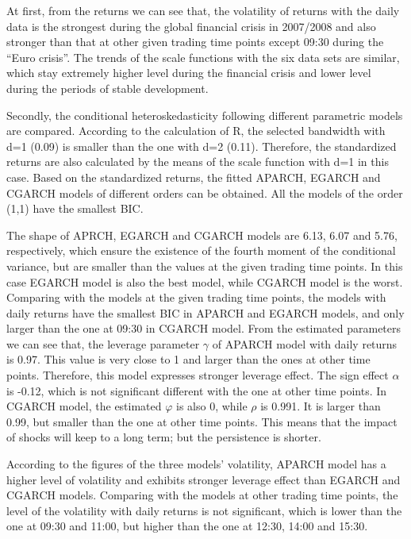 At first, from the returns we can see that, the volatility of returns with the daily data is the strongest during the global financial crisis in 2007/2008 and also stronger than that at other given trading time points except 09:30 during the ``Euro crisis''. The trends of the scale functions with the six data sets are similar, which stay extremely higher level during the financial crisis and lower level during the periods of stable development.

Secondly, the conditional heteroskedasticity following different parametric models are compared. According to the calculation of R, the selected bandwidth with d=1 (0.09) is smaller than the one with d=2 (0.11). Therefore, the standardized returns are also calculated by the means of the scale function with d=1 in this case. Based on the standardized returns, the fitted APARCH, EGARCH and CGARCH models of different orders can be obtained. All the models of the order (1,1) have the smallest BIC.

The shape of APRCH, EGARCH and CGARCH models are 6.13, 6.07 and 5.76, respectively, which ensure the existence of the fourth moment of the conditional variance, but are smaller than the values at the given trading time points. In this case EGARCH model is also the best model, while CGARCH model is the worst. Comparing with the models at the given trading time points, the models with daily returns have the smallest BIC in APARCH and EGARCH models, and only larger than the one at 09:30 in CGARCH model. From the estimated parameters we can see that, the leverage parameter $\gamma$  of APARCH model with daily returns is 0.97. This value is very close to 1 and larger than the ones at other time points. Therefore, this model expresses stronger leverage effect. The sign effect  $\alpha$  is -0.12, which is not significant different with the one at other time points. In CGARCH model, the estimated $\varphi$  is also 0, while $\rho$  is 0.991. It is larger than 0.99, but smaller than the one at other time points. This means that the impact of shocks will keep to a long term; but the persistence is shorter.

According to the figures of the three models’ volatility, APARCH model has a higher level of volatility and exhibits stronger leverage effect than EGARCH and CGARCH models. Comparing with the models at other trading time points, the level of the volatility with daily returns is not significant, which is lower than the one at 09:30 and 11:00, but higher than the one at 12:30, 14:00 and 15:30.

